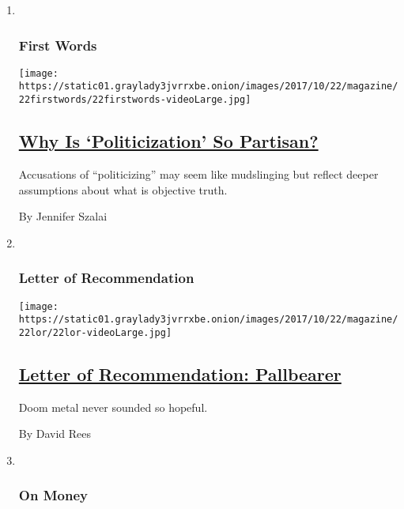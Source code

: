 \begin{enumerate}
\def\labelenumi{\arabic{enumi}.}
\item ~
  \hypertarget{first-words}{%
  \subsubsection{First Words}\label{first-words}}

  \texttt{[image: https://static01.graylady3jvrrxbe.onion/images/2017/10/22/magazine/22firstwords/22firstwords-videoLarge.jpg]}

  \hypertarget{why-is-politicization-so-partisan}{%
  \subsection{\texorpdfstring{\href{/2017/10/17/magazine/why-is-politicization-so-partisan.html}{Why
  Is `Politicization' So
  Partisan?}}{Why Is `Politicization' So Partisan?}}\label{why-is-politicization-so-partisan}}

  Accusations of ``politicizing'' may seem like mudslinging but reflect
  deeper assumptions about what is objective truth.

  By Jennifer Szalai
\item ~
  \hypertarget{letter-of-recommendation}{%
  \subsubsection{Letter of
  Recommendation}\label{letter-of-recommendation}}

  \texttt{[image: https://static01.graylady3jvrrxbe.onion/images/2017/10/22/magazine/22lor/22lor-videoLarge.jpg]}

  \hypertarget{letter-of-recommendation-pallbearer}{%
  \subsection{\texorpdfstring{\href{/2017/10/19/magazine/letter-of-recommendation-pallbearer.html}{Letter
  of Recommendation:
  Pallbearer}}{Letter of Recommendation: Pallbearer}}\label{letter-of-recommendation-pallbearer}}

  Doom metal never sounded so hopeful.

  By David Rees
\item ~
  \hypertarget{on-money}{%
  \subsubsection{On Money}\label{on-money}}


\end{enumerate}
